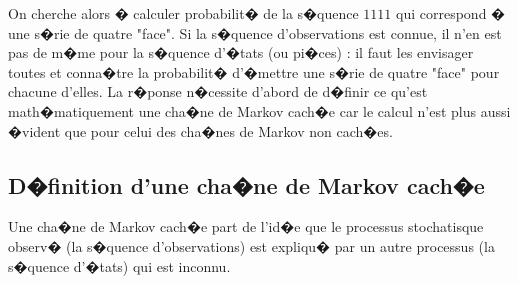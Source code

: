 On cherche alors � calculer probabilit� de la s�quence $1111$ qui correspond � une s�rie de quatre "face". Si la s�quence d'observations est connue, il n'en est pas de m�me pour la s�quence d'�tats (ou pi�ces) : il faut les envisager toutes et conna�tre la probabilit� d'�mettre une s�rie de quatre "face" pour chacune d'elles. La r�ponse n�cessite d'abord de d�finir ce qu'est math�matiquement une cha�ne de Markov cach�e car le calcul n'est plus aussi �vident que pour celui des cha�nes de Markov non cach�es.








\subsection{D�finition d'une cha�ne de Markov cach�e}

Une cha�ne de Markov cach�e part de l'id�e que le processus stochatisque observ� (la s�quence d'observations) est expliqu� par un autre processus (la s�quence d'�tats) qui est inconnu.



